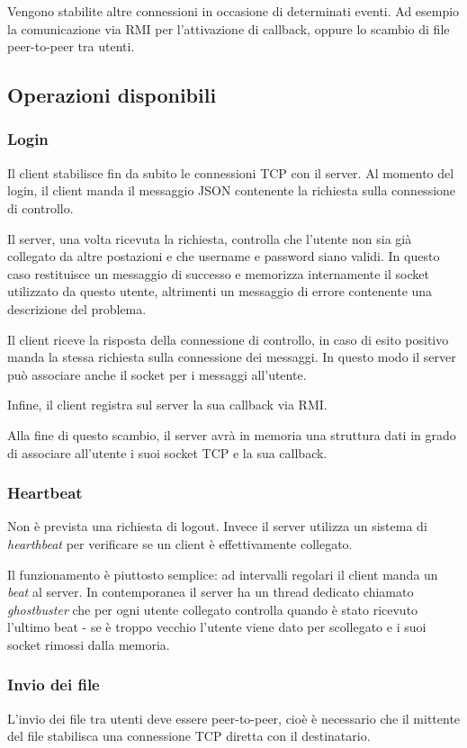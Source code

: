 Vengono stabilite altre connessioni in occasione di determinati eventi. Ad esempio la comunicazione via RMI per l'attivazione di callback, oppure lo scambio di file peer-to-peer tra utenti.
    
\subsection{Operazioni disponibili}
\label{ssec:operazioni}
\subsubsection{Login}
Il client stabilisce fin da subito le connessioni TCP con il server. Al momento del login, il client manda il messaggio JSON contenente la richiesta sulla connessione di controllo.

Il server, una volta ricevuta la richiesta, controlla che l'utente non sia già collegato da altre postazioni e che username e password siano validi. In questo caso restituisce un messaggio di successo e memorizza internamente il socket utilizzato da questo utente, altrimenti un messaggio di errore contenente una descrizione del problema.

Il client riceve la risposta della connessione di controllo, in caso di esito positivo manda la stessa richiesta sulla connessione dei messaggi. In questo modo il server può associare anche il socket per i messaggi all'utente.

Infine, il client registra sul server la sua callback via RMI.

Alla fine di questo scambio, il server avrà in memoria una struttura dati in grado di associare all'utente i suoi socket TCP e la sua callback.

\subsubsection{Heartbeat}
Non è prevista una richiesta di logout. Invece il server utilizza un sistema di \textit{hearthbeat} per verificare se un client è effettivamente collegato.

Il funzionamento è piuttosto semplice: ad intervalli regolari il client manda un \textit{beat} al server. In contemporanea il server ha un thread dedicato chiamato \textit{ghostbuster} che per ogni utente collegato controlla quando è stato ricevuto l'ultimo beat - se è troppo vecchio l'utente viene dato per scollegato e i suoi socket rimossi dalla memoria.

\subsubsection{Invio dei file}
L'invio dei file tra utenti deve essere peer-to-peer, cioè è necessario che il mittente del file stabilisca una connessione TCP diretta con il destinatario.

